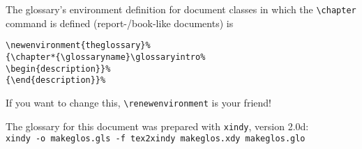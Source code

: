\documentclass[a4paper]{article}
\begin{document}
The glossary's environment definition for document classes in which the
\verb+\chapter+ command is defined (report-/book-like documents) is 
\begin{verbatim}
\newenvironment{theglossary}%
{\chapter*{\glossaryname}\glossaryintro%
\begin{description}}%
{\end{description}}%
\end{verbatim}

If you want to change this, \verb+\renewenvironment+ is your friend!

The glossary for this document was prepared with \verb+xindy+, version 2.0d:\\
\verb+xindy -o makeglos.gls -f tex2xindy makeglos.xdy makeglos.glo+
\end{document}
